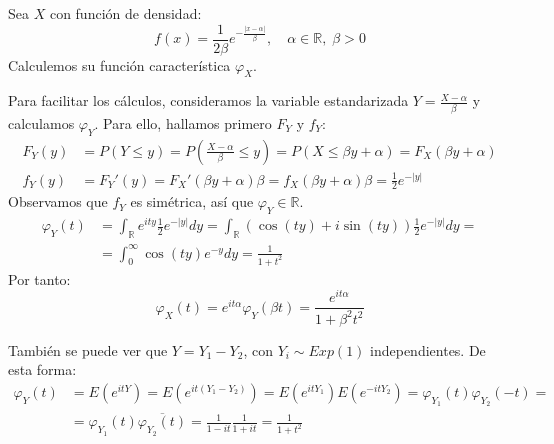 \begin{exercise}
    Sea $X$ con función de densidad:
    $$f(x) = \frac{1}{2\beta}e^{-\frac{|x-\alpha|}{\beta}}, \quad \alpha \in \mathbb{R}, \; \beta > 0$$
    Calculemos su función característica $\varphi_X$.

    Para facilitar los cálculos, consideramos la variable estandarizada $Y = \frac{X-\alpha}{\beta}$ y calculamos $\varphi_Y$.
    Para ello, hallamos primero $F_Y$ y $f_Y$:
    \begin{align*}
        F_Y(y) & = P(Y \leq y) = P\left(\frac{X-\alpha}{\beta} \leq y\right) = P(X \leq \beta y + \alpha) = F_X(\beta y + \alpha) \\
        f_Y(y) & = F_Y'(y) = F_X'(\beta y + \alpha)\beta = f_X(\beta y + \alpha)\beta = \frac{1}{2}e^{-|y|}
    \end{align*}
    Observamos que $f_Y$ es simétrica, así que $\varphi_Y \in \mathbb{R}$.
    \begin{align*}
        \varphi_Y(t) & = \int_\mathbb{R} e^{ity}\frac{1}{2}e^{-|y|}dy = \int_\mathbb{R} (\cos(ty) + i\sin(ty))\frac{1}{2}e^{-|y|}dy = \\
                     & = \int_0^\infty \cos(ty)e^{-y}dy = \frac{1}{1+t^2}
    \end{align*}
    Por tanto:
    $$\varphi_X(t) = e^{it\alpha}\varphi_Y(\beta t) = \frac{e^{it\alpha}}{1+\beta^2t^2}$$

    También se puede ver que $Y = Y_1 - Y_2$, con $Y_i \sim Exp(1)$ independientes.
    De esta forma:
    \begin{align*}
        \varphi_Y(t) & = E(e^{itY}) = E(e^{it(Y_1-Y_2)}) = E(e^{itY_1})E(e^{-itY_2}) = \varphi_{Y_1}(t)\varphi_{Y_2}(-t) = \\
                     & = \varphi_{Y_1}(t) \overline{\varphi_{Y_2}(t)} = \frac{1}{1-it}\frac{1}{1+it} = \frac{1}{1+t^2}
    \end{align*}
\end{exercise}
